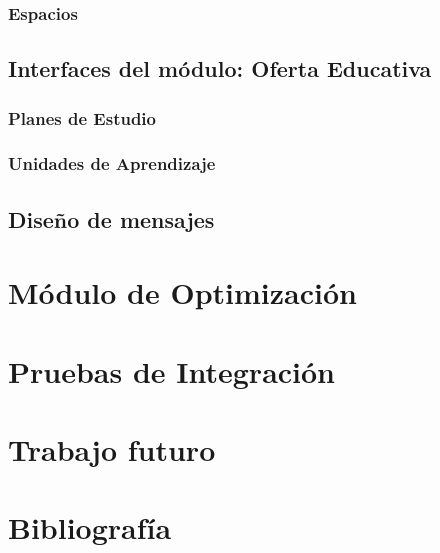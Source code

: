 \documentclass[10pt]{book}
\begin{document}
\subsection{Espacios}

\section{Interfaces del módulo: Oferta Educativa}
\subsection{Planes de Estudio}

\subsection{Unidades de Aprendizaje}

\section{Diseño de mensajes}

\chapter{Módulo de Optimización}\label{chp:moduloOpt}

\chapter{Pruebas de Integración}\label{chp:pruebasIntegracion}

\chapter{Trabajo futuro}\label{chp:trabajoFuturo}

\chapter{Bibliografía}\label{chp:bibliografia}


%
%



\end{document}

